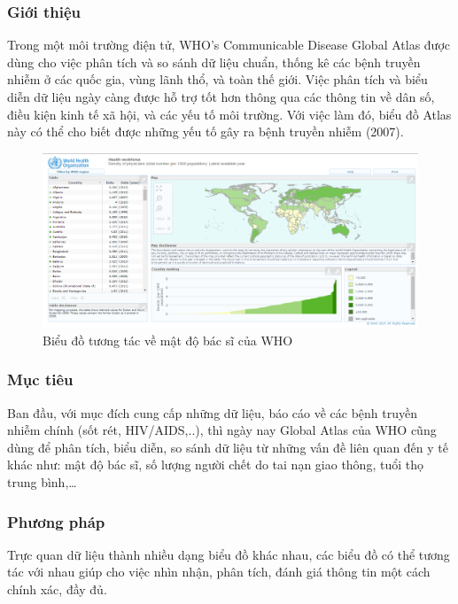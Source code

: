 \documentclass[12pt,a4paper]{article}
\begin{document}
\subsubsection{Giới thiệu}
Trong một môi trường điện tử, WHO’s Communicable Disease Global Atlas được dùng cho việc phân tích và so sánh dữ liệu chuẩn, thống kê các bệnh truyền nhiễm ở các quốc gia, vùng lãnh thổ, và toàn thế giới. Việc phân tích và biểu diễn dữ liệu ngày càng được hỗ trợ tốt hơn thông qua các thông tin về dân số, điều kiện kinh tế xã hội, và các yếu tố môi trường. Với việc làm đó, biểu đồ Atlas này có thể cho biết được những yếu tố gây ra bệnh truyền nhiễm (2007)\cite{gha}.
\begin{figure}[htp]
    \begin{center}
    \includegraphics[scale=.4]{image/globalatlas}
    \caption{Biểu đồ tương tác về mật độ bác sĩ của WHO}
    \label{refhinh2}
    \end{center}
\end{figure}

\subsubsection{Mục tiêu}
Ban đầu, với mục đích cung cấp những dữ liệu, báo cáo về các bệnh truyền nhiễm chính (sốt rét, HIV/AIDS,..), thì ngày nay Global Atlas của WHO cũng dùng để phân tích, biểu diễn, so sánh dữ liệu từ những vấn đề liên quan đến y tế khác như: mật độ bác sĩ, số lượng người chết do tai nạn giao thông, tuổi thọ trung bình,… 

\subsubsection{Phương pháp}
Trực quan dữ liệu thành nhiều dạng biểu đồ khác nhau, các biểu đồ có thể tương tác với nhau giúp cho việc nhìn nhận, phân tích, đánh giá thông tin một cách chính xác, đầy đủ.
\end{document}
